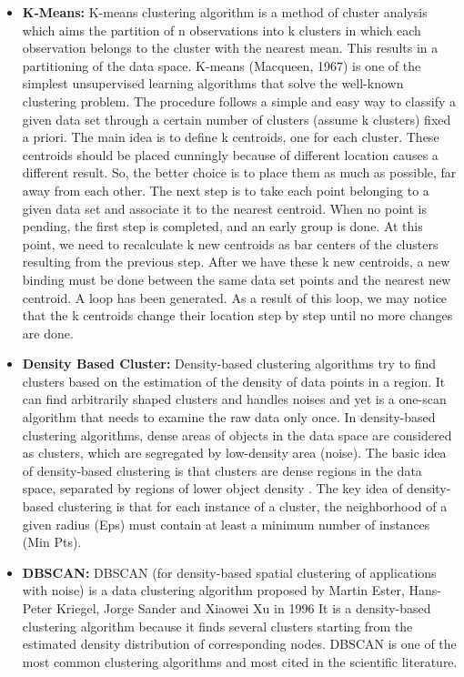 \begin{itemize}
\item \textbf{K-Means:}
K-means clustering algorithm \cite{HitchcockKmeans} is a method of cluster analysis which aims the partition of n observations into k clusters in which each observation belongs to the cluster with the nearest mean. This results in a partitioning of the data space. K-means (Macqueen, 1967) is one of the simplest unsupervised learning algorithms that solve the well-known clustering problem. The procedure follows a simple and easy way to classify a given data set through a certain number of clusters (assume k clusters) fixed a priori. The main idea is to define k centroids, one for each cluster. These centroids should be placed cunningly because of different location causes a different result. So, the better choice is to place them as much as possible, far away from each other. The next step is to take each point belonging to a given data set and associate it to the nearest centroid. When no point is pending, the first step is completed, and an early group is done. At this point, we need to recalculate k new centroids as bar centers of the clusters resulting from the previous step. After we have these k new centroids, a new binding must be done between the same data set points and the nearest new centroid. A loop has been generated. As a result of this loop, we may notice that the k centroids change their location step by step until no more changes are done.

\item \textbf{Density Based Cluster:}
Density-based clustering algorithms \cite{WekaCC} try to find clusters based on the estimation of the density of data points in a region.
It can find arbitrarily shaped clusters and handles noises and yet is a one-scan algorithm that needs to examine the raw data only once. In density-based clustering algorithms, dense areas of objects in the data space are considered as clusters, which are segregated by low-density area (noise). The basic idea of density-based clustering is that clusters are dense regions in the data space, separated by regions of lower object density \cite{WEKATalankiDensity}.
The key idea of density-based clustering is that for each instance of a cluster, the neighborhood of a given radius (Eps) must contain at least a minimum number of instances (Min Pts).

\item \textbf{DBSCAN:}
DBSCAN (for density-based spatial clustering of applications with noise) is a data clustering algorithm proposed by Martin Ester, Hans-Peter Kriegel, Jorge Sander and Xiaowei Xu in 1996 It is a density-based clustering algorithm because it finds several clusters starting from the estimated density distribution of corresponding nodes. DBSCAN \cite{Kisilevich2010PDBSCANAD} is one of the most common clustering algorithms and most cited in the scientific literature.
\end{itemize}

